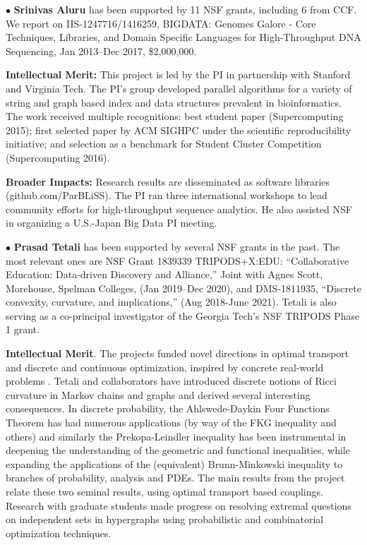 \documentclass[12pt]{article}
\begin{document}
\vspace*{0.25em}
\noindent
$\bullet$
{\bf Srinivas Aluru} has been supported by 11 NSF grants, including 6 from CCF. We report on IIS-1247716/1416259, BIGDATA: Genomes Galore - Core Techniques, Libraries, and Domain Specific Languages for High-Throughput DNA Sequencing, Jan 2013--Dec 2017, \$2,000,000.

{\bf Intellectual Merit:} This project is led by the PI in partnership with Stanford and Virginia Tech. The PI's group developed parallel algorithms for a variety of string and graph based index and data structures prevalent in bioinformatics. The work received multiple recognitions: best student paper (Supercomputing 2015); first selected paper by ACM SIGHPC under the scientific reproducibility initiative; and selection as a benchmark for Student Cluster Competition (Supercomputing 2016).

{\bf Broader Impacts:} Research results are disseminated as software libraries (github.com/ParBLiSS). The PI ran three international workshops to lead community efforts for high-throughput sequence analytics. He also assisted NSF in organizing a U.S.-Japan Big Data PI meeting.

\vspace*{0.25em}
\noindent
$\bullet$
{\bf Prasad Tetali} has been supported by several NSF grants in the past. The most relevant ones are NSF Grant 1839339 TRIPODS+X:EDU: “Collaborative Education: Data-driven Discovery and Alliance,” Joint with Agnes Scott, Morehouse, Spelman Colleges,  (Jan 2019--Dec 2020), and DMS-1811935, “Discrete convexity, curvature, and implications,” (Aug 2018-June 2021).  Tetali is also serving as a co-principal investigator of the Georgia Tech's NSF TRIPODS Phase 1 grant.

{\bf Intellectual Merit}.
The projects funded novel directions in optimal transport and discrete and continuous optimization, inspired by concrete real-world problems \cite{gozlan2015characterization, gozlan2014kantorovich}. 
Tetali and collaborators have introduced discrete notions of Ricci curvature in Markov
chains and graphs and derived several interesting consequences. In discrete probability, the Ahlswede-Daykin Four
Functions Theorem has had numerous applications (by way of the FKG inequality and others) and similarly the Prekopa-Leindler inequality has been instrumental in deepening the understanding of the geometric and functional inequalities,
while expanding the applications of the (equivalent) Brunn-Minkowski inequality to branches of probability, analysis and
PDEs. The main results from the project relate these two seminal results, using optimal transport based couplings.
Research with graduate students made progress on resolving extremal questions on independent sets in hypergraphs
using probabilistic and combinatorial optimization techniques. 
\end{document}
